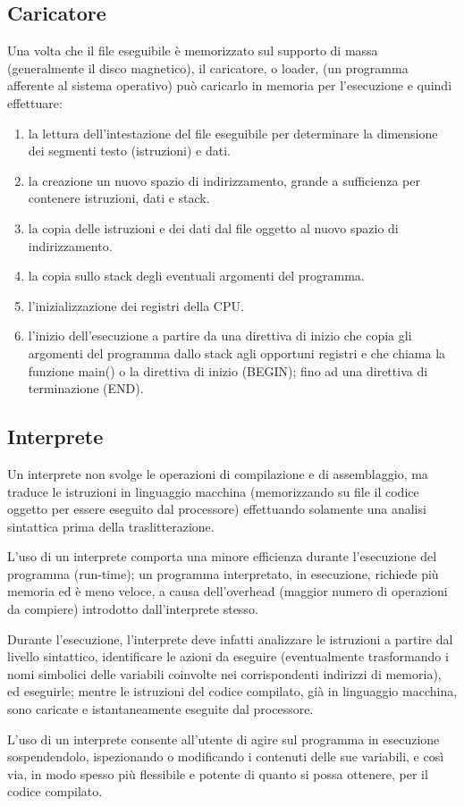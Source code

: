 \documentclass[12pt]{article}
\begin{document}
\subsection{Caricatore}
Una volta che il file eseguibile è memorizzato sul supporto di massa (generalmente il disco magnetico), il caricatore, o loader, (un programma afferente al sistema operativo) può caricarlo in memoria per l’esecuzione e quindi effettuare:
\begin{enumerate}
    \item la lettura dell’intestazione del file eseguibile per determinare la dimensione dei segmenti testo (istruzioni) e dati.
    \item la creazione un nuovo spazio di indirizzamento, grande a sufficienza per contenere istruzioni, dati e stack.
    \item la copia delle istruzioni e dei dati dal file oggetto al nuovo spazio di indirizzamento.
    \item la copia sullo stack degli eventuali argomenti del programma.
    \item l’inizializzazione dei registri della CPU.
    \item  l’inizio dell’esecuzione a partire da una direttiva di inizio che copia gli argomenti del programma dallo stack agli opportuni registri e che chiama la funzione main() o la direttiva di inizio (BEGIN); fino ad una direttiva di terminazione (END).
\end{enumerate}

\subsection{\textbf{Interprete}}
Un interprete non svolge le operazioni di compilazione e di assemblaggio, ma traduce le istruzioni in linguaggio macchina (memorizzando su file il codice oggetto per essere eseguito dal processore) effettuando solamente una analisi sintattica prima della traslitterazione.\par\medskip\noindent
L’uso di un interprete comporta una minore efficienza durante l’esecuzione del programma (run-time); un programma interpretato, in esecuzione, richiede più memoria ed è meno veloce, a causa dell'overhead (maggior numero di operazioni da compiere) introdotto dall'interprete stesso.\par\medskip\noindent
Durante l'esecuzione, l'interprete deve infatti analizzare le istruzioni a partire dal livello sintattico, identificare le azioni da eseguire (eventualmente trasformando i nomi simbolici delle variabili coinvolte nei corrispondenti indirizzi di memoria), ed eseguirle; mentre le istruzioni del codice compilato, già in linguaggio macchina, sono caricate e istantaneamente eseguite dal processore.\par\medskip\noindent
L'uso di un interprete consente all'utente di agire sul programma in esecuzione sospendendolo, ispezionando o modificando i contenuti delle sue variabili, e così via, in modo spesso più flessibile e potente di quanto si possa ottenere, per il codice compilato.
\newpage
\end{document}
